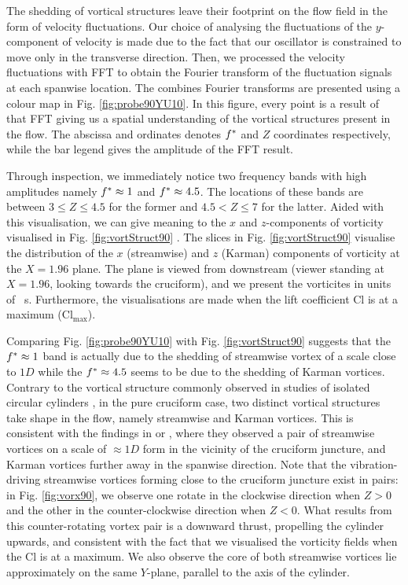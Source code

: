 \documentclass[oneside]{utmthesis}
\begin{document}
The shedding of vortical structures leave their footprint on the flow field in the form of velocity fluctuations. Our choice of analysing the fluctuations of the $y$-component of velocity is made due to the fact that our oscillator is constrained to move only in the transverse direction. Then, we processed the velocity fluctuations with FFT to obtain the Fourier transform of the fluctuation signals at each spanwise location. The combines Fourier transforms are presented using a colour map in Fig. \ref{fig:probe90YU10}. In this figure, every point is a result of that FFT giving us a spatial understanding of the vortical structures present in the flow. The abscissa and ordinates denotes $f^{*}$ and $Z$ coordinates respectively, while the bar legend gives the amplitude of the FFT result.

Through inspection, we immediately notice two frequency bands with high amplitudes namely $f^{*} \approx 1$ and $f^{*} \approx 4.5$. The locations of these bands are between $3 \leq Z \leq 4.5$ for the former and $4.5 < Z \leq 7$ for the latter. Aided with this visualisation, we can give meaning to the $x$ and $z$-components of vorticity visualised in Fig. \ref{fig:vortStruct90} . The slices in Fig. \ref{fig:vortStruct90} visualise the distribution of the $x$ (streamwise) and $z$ (Karman) components of vorticity at the $X = 1.96$ plane. The plane is viewed from downstream (viewer standing at $X = 1.96$, looking towards the cruciform), and we present the vorticites in units of \si{\per\second}. Furthermore, the visualisations are made when the lift coefficient Cl is at a maximum ($\text{Cl}_{\text{max}}$).

Comparing Fig. \ref{fig:probe90YU10} with Fig. \ref{fig:vortStruct90} suggests that the $f^{*} \approx 1$ band is actually due to the shedding of streamwise vortex of a scale close to $1D$ while the $f^{*} \approx 4.5$ seems to be due to the shedding of Karman vortices. Contrary to the vortical structure commonly observed in studies of isolated circular cylinders \citep{Deng2007,Kinaci2016,Duranay2020}, in the pure cruciform case, two distinct vortical structures take shape in the flow, namely streamwise and Karman vortices. This is consistent with the findings in \citet{Koide2017} or \citet{Zhao2018a}, where they observed a pair of streamwise vortices on a scale of $\approx 1D$ form in the vicinity of the cruciform juncture, and Karman vortices further away in the spanwise direction. Note that the vibration-driving streamwise vortices forming close to the cruciform juncture exist in pairs: in Fig. \ref{fig:vorx90}, we observe one rotate in the clockwise direction when $Z > 0$ and the other in the counter-clockwise direction when $Z < 0$. What results from this counter-rotating vortex pair is a downward thrust, propelling the cylinder upwards, and consistent with the fact that we visualised the vorticity fields when the Cl is at a maximum. We also observe the core of both streamwise vortices lie approximately on the same $Y$-plane, parallel to the axis of the cylinder.
\end{document}
